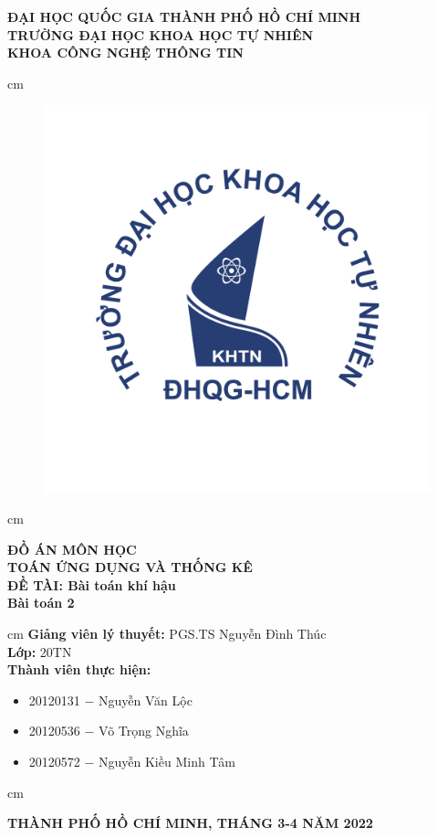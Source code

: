 \documentclass[a4paper]{article}
\author{Nguyễn Văn Lộc}
\begin{document}
\fancyhf{}
\chead{}
\cfoot{\thepage}
\rfoot{}
\lfoot{}
\pagestyle{fancy}
\begin{titlepage}
\begin{mybox}
\begin{center}
\fontsize{12}{12}\selectfont
\textbf{ĐẠI HỌC QUỐC GIA THÀNH PHỐ HỒ CHÍ MINH}\\
\textbf{TRƯỜNG ĐẠI HỌC KHOA HỌC TỰ NHIÊN}\\
\textbf{KHOA CÔNG NGHỆ THÔNG TIN}
\end{center}
 cm
\begin{figure}[H]
\begin{center}
\includegraphics[scale=0.25]{images/logo}
\end{center}
\end{figure}
 cm
\begin{center}
\fontsize{18}{14}\selectfont
\textbf{ĐỒ ÁN MÔN HỌC}\\
\fontsize{26}{16}\selectfont
\textbf{TOÁN ỨNG DỤNG VÀ THỐNG KÊ}\\
\fontsize{18}{12}\selectfont
\textbf{ĐỀ TÀI: Bài toán khí hậu}\\
\textbf{Bài toán 2}
\end{center}
 cm
\fontsize{14}{12}\selectfont
\textbf{Giảng viên lý thuyết:} PGS.TS Nguyễn Đình Thúc\\
\textbf{Lớp:} 20TN\\
\textbf{Thành viên thực hiện:}
\begin{itemize}
\item 20120131 $-$ Nguyễn Văn Lộc
\item 20120536 $-$ Võ Trọng Nghĩa
\item 20120572 $-$ Nguyễn Kiều Minh Tâm
\end{itemize}
 cm
\begin{center}
\textbf{THÀNH PHỐ HỒ CHÍ MINH, THÁNG 3-4 NĂM 2022}
\end{center}
\end{mybox}
\end{titlepage}
\end{document}
